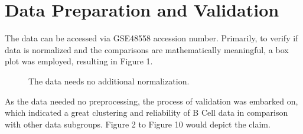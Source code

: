 \documentclass[3p,authoryear,preprint,12pt]{elsarticle}
\makeatletter
\def\fixFloatSize#1{}%
\makeatother
\begin{document}
\section{Data Preparation and Validation}
The data can be accessed via GSE48558 accession number. Primarily, to verify if data is normalized and the comparisons are mathematically meaningful, a box plot was employed, resulting in Figure 1.
\bgroup
\fixFloatSize{img/boxplot.png}
\begin{figure}[!htbp]
	\centering \makeatletter{}
	\makeatother 
	\caption{{The data needs no additional normalization.}}
	\label{f-c2b15a1baca9}
\end{figure}
\egroup

As the data needed no preprocessing, the process of validation was embarked on, which indicated a great clustering and reliability of B Cell data in comparison with other data subgroups. Figure 2 to Figure 10 would depict the claim.
\end{document}
